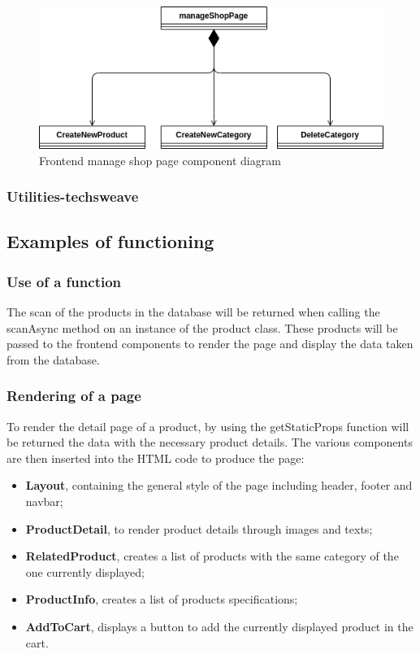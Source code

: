 \begin{figure}[!ht]
  \caption{ Frontend manage shop page component diagram}
  \vspace{10px}
  \includegraphics[scale=0.39]{../../../../Images/Diagrammi/maintainerManual/FE/manageShopDiagram.png}
  \centering
\end{figure}
\clearpage
\subsubsection{Utilities-techsweave}














\subsection{Examples of functioning}
\subsubsection{Use of a function}
The scan of the products in the database will be returned when calling the scanAsync method on an instance of the product class. These products will be passed to the frontend components to render the page and display the data taken from the database.
\subsubsection{Rendering of a page}
To render the detail page of a product, by using the getStaticProps function will be returned the data with the necessary product details. The various components are then inserted into the HTML code to produce the page:
\begin{itemize}
  \item \textbf{Layout}, containing the general style of the page including header, footer and navbar;
  \item \textbf{ProductDetail}, to render product details through images and texts;
  \item \textbf{RelatedProduct}, creates a list of products with the same category of the one currently displayed;
  \item \textbf{ProductInfo}, creates a list of products specifications;
  \item \textbf{AddToCart}, displays a button to add the currently displayed product in the cart.
\end{itemize}

